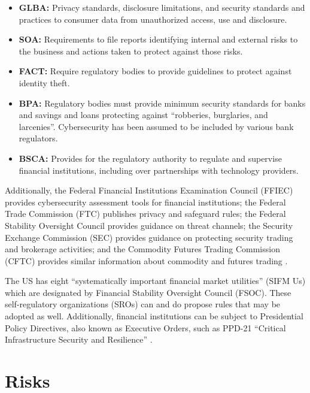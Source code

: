 \begin{itemize}
  \item \textbf{GLBA:} Privacy standards, disclosure limitations, and security standards and practices to consumer data from unauthorized access, use and disclosure.
  \item \textbf{SOA:} Requirements to file reports identifying internal and external risks to the business and actions taken to protect against those risks.
  \item \textbf{FACT:} Require regulatory bodies to provide guidelines to protect against identity theft.
  \item \textbf{BPA:} Regulatory bodies must provide minimum security standards for banks and savings and loans protecting against ``robberies, burglaries, and larcenies''. Cybersecurity has been assumed to be included by various bank regulators.
  \item \textbf{BSCA:} Provides for the regulatory authority to regulate and supervise financial institutions, including over partnerships with technology providers.
\end{itemize}


Additionally, the Federal Financial Institutions Examination Council (FFIEC) provides cybersecurity assessment tools for financial institutions; the Federal Trade Commission (FTC) publishes privacy and safeguard rules; the Federal Stability Oversight Council provides guidance on threat channels; the Security Exchange Commission (SEC) provides guidance on protecting security trading and brokerage activities; and the Commodity Futures Trading Commission (CFTC) provides similar information about commodity and futures trading \parencite{murphyFinancialServicesCybersecurity2016,scottIntroductionFinancialServices2021}.

The US has eight ``systematically important financial market utilities'' (SIFM Us) which are designated by Financial Stability Oversight Council (FSOC). These self-regulatory organizations (SROs)  can and do propose rules that may be adopted as well. Additionally, financial institutions can be subject to Presidential Policy Directives, also known as Executive Orders, such as PPD-21 ``Critical Infrastructure Security and Resilience'' \parencite{scottIntroductionFinancialServices2021}.



\section{Risks}

